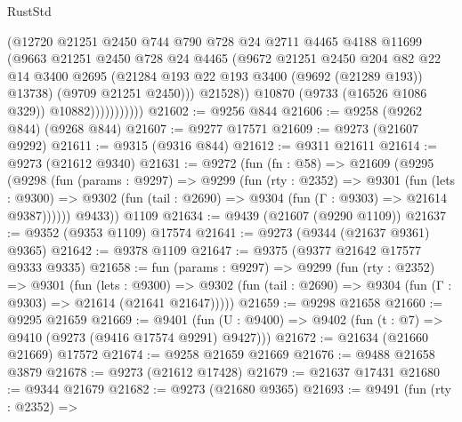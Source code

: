 \begin{lexlean}{RustStd}
\begin{coremodule}
                            (@12720
                              @21251
                              @2450
                              @744
                              @790
                              @728
                              @24
                              @2711
                              @4465
                              @4188
                              @11699
                              (@9663
                                @21251
                                @2450
                                @728
                                @24
                                @4465
                                (@9672
                                  @21251
                                  @2450
                                  @204
                                  @82
                                  @22
                                  @14
                                  @3400
                                  @2695
                                  (@21284 @193 @22 @193 @3400 (@9692 (@21289 @193)) @13738)
                                  (@9709 @21251 @2450)))
                              @21528))
                          @10870
                          (@9733 (@16526 @1086 @329))
                          @10882)))))))))))
@21602 := @9256 @844
@21606 := @9258 (@9262 @844) (@9268 @844)
@21607 := @9277 @17571
@21609 := @9273 (@21607 @9292)
@21611 := @9315 (@9316 @844)
@21612 := @9311 @21611
@21614 := @9273 (@21612 @9340)
@21631 := @9272
    (fun (fn : @58) =>
    @21609
      (@9295
        (@9298
          (fun (params : @9297) =>
          @9299
            (fun (rty : @2352) =>
            @9301
              (fun (lets : @9300) =>
              @9302 (fun (tail : @2690) => @9304 (fun (Γ : @9303) => @21614 @9387))))))
        @9433))
    @1109
@21634 := @9439 (@21607 (@9290 @1109))
@21637 := @9352 (@9353 @1109) @17574
@21641 := @9273 (@9344 (@21637 @9361) @9365)
@21642 := @9378 @1109
@21647 := @9375 (@9377 @21642 @17577 @9333 @9335)
@21658 := fun (params : @9297) =>
  @9299
    (fun (rty : @2352) =>
    @9301
      (fun (lets : @9300) =>
      @9302 (fun (tail : @2690) => @9304 (fun (Γ : @9303) => @21614 (@21641 @21647)))))
@21659 := @9298 @21658
@21660 := @9295 @21659
@21669 := @9401
    (fun (U : @9400) => @9402 (fun (t : @7) => @9410 (@9273 (@9416 @17574 @9291) @9427)))
@21672 := @21634 (@21660 @21669) @17572
@21674 := @9258 @21659 @21669
@21676 := @9488 @21658 @3879
@21678 := @9273 (@21612 @17428)
@21679 := @21637 @17431
@21680 := @9344 @21679
@21682 := @9273 (@21680 @9365)
@21693 := @9491
    (fun (rty : @2352) =>

\end{coremodule}
\end{lexlean}
